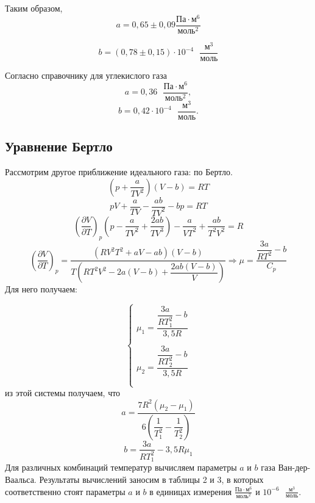 \documentclass[12pt,a4paper]{article}
\begin{document}
Таким образом,
\begin{equation*}
    a = 0,65 \pm 0,09 \frac{\text{Па}\cdot\text{м}^6}{\text{моль}^2}
\end{equation*}

\begin{equation*}
    b = (0,78 \pm 0,15) \cdot 10^{-4} \text{ }\frac{\text{м}^3}{\text{моль}}
\end{equation*}

Согласно справочнику для углекислого газа \[ a = 0,36 \text{ } \frac{\text{Па}\cdot\text{м}^6}{\text{моль}^2}, \] \[ b = 0,42\cdot 10^{-4} \text{ }\frac{\text{м}^3}{\text{моль}}. \]

\subsection{Уравнение Бертло}


Рассмотрим другое приближение идеального газа: по Бертло.
\[\left( p + \dfrac{a}{TV^2} \right) (V - b) = RT\]
\[pV + \dfrac{a}{TV} - \dfrac{ab}{TV^2} - bp = RT\]
\[\left(\dfrac{\partial V}{\partial T} \right)_p \left( p - \dfrac{a}{TV^2} + \dfrac{2ab}{TV^3} \right) - \dfrac{a}{VT^2} + \dfrac{ab}{T^2 V^2} = R\]
\[\left(\dfrac{\partial V}{\partial T} \right)_p = \dfrac{(RV^2T^2 + aV - ab)(V-b)}{T \left( RT^2V^2 - 2a(V-b) + \dfrac{2ab(V-b)}{V} \right)} \Rightarrow \mu = \dfrac{\dfrac{3a}{RT^2} - b}{C_p} \]
Для него получаем:

\begin{equation*} 
 		\begin{cases}
   			\mu_1 = \dfrac{\dfrac{3a}{RT_1^2} - b}{3,5R}\\
   			\\
   			\mu_2 = \dfrac{\dfrac{3a}{RT_2^2} - b}{3,5R}\\
   			\\
   			\end{cases}
	\end{equation*}
	из этой системы получаем, что 
	\[a = \dfrac{7R^2(\mu_2 - \mu_1)}{6 \left( \dfrac{1}{T_1^2} - \dfrac{1}{T_2^2} \right)} \]
	\[b = \dfrac{3a}{RT_1^2} - 3,5R \mu_1 \]
Для различных комбинаций температур  вычисляем параметры $a$ и $b$ газа Ван-дер-Ваальса. Результаты вычислений заносим в таблицы 2 и 3, в которых соответственно стоят  параметры $a$ и $b$ в единицах измерения $\displaystyle \frac{\text{Па}\cdot\text{м}^6}{\text{моль}^2} $  и $10^{-6}$$\displaystyle\text{ }\frac{\text{м}^3}{\text{моль}}$. 
\end{document}
